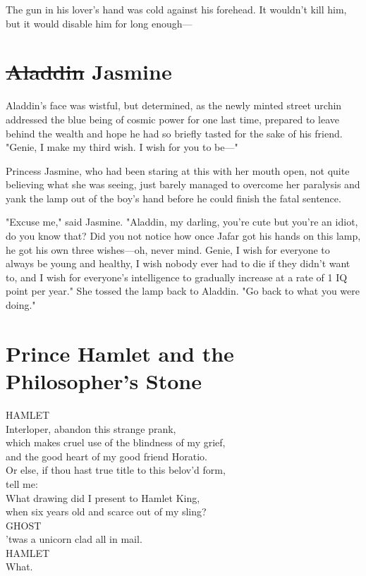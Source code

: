 The gun in his lover's hand was cold against his forehead. It wouldn't kill
him, but it would disable him for long enough---
\section{\sout{Aladdin} Jasmine}
Aladdin's face was wistful, but determined, as the newly minted street urchin
addressed the blue being of cosmic power for one last time, prepared to leave
behind the wealth and hope he had so briefly tasted for the sake of his friend.
"Genie, I make my third wish. I wish for you to be---"

Princess Jasmine, who had been staring at this with her mouth open, not quite
believing what she was seeing, just barely managed to overcome her paralysis
and yank the lamp out of the boy's hand before he could finish the fatal
sentence.

"Excuse me," said Jasmine. "Aladdin, my darling, you're cute but you're an
idiot, do you know that? Did you not notice how once Jafar got his hands on
this lamp, he got his own three wishes---oh, never mind. Genie, I wish for
everyone to always be young and healthy, I wish nobody ever had to die if they
didn't want to, and I wish for everyone's intelligence to gradually increase at
a rate of 1 IQ point per year." She tossed the lamp back to Aladdin. "Go back
to what you were doing."
\section{Prince Hamlet and the Philosopher's Stone}
\noindent{}HAMLET\\
Interloper, abandon this strange prank,\\
which makes cruel use of the blindness of my grief,\\
and the good heart of my good friend Horatio.\\
Or else, if thou hast true title to this belov'd form,\\
tell me:\\
What drawing did I present to Hamlet King,\\
when six years old and scarce out of my sling?\\

\noindent{}GHOST\\
'twas a unicorn clad all in mail.\\

\noindent{}HAMLET\\
What.\\

